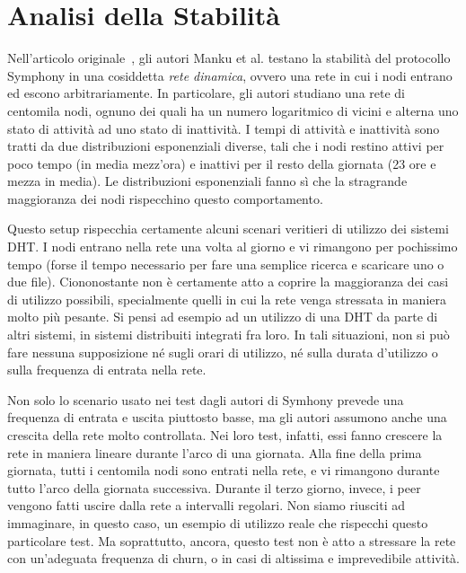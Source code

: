 \documentclass[prodmode,acmtap]{acmlarge}
\begin{document}
\section{Analisi della Stabilità} \label{stabilita}

Nell'articolo originale~\cite{symphony}, gli autori Manku et al. testano la stabilità del protocollo Symphony in una cosiddetta \emph{rete dinamica}, ovvero una rete in cui i nodi entrano ed escono arbitrariamente. In particolare, gli autori studiano una rete di centomila nodi, ognuno dei quali ha un numero logaritmico di vicini e alterna uno stato di attività ad uno stato di inattività. I tempi di attività e inattività sono tratti da due distribuzioni esponenziali diverse, tali che i nodi restino attivi per poco tempo (in media mezz'ora) e inattivi per il resto della giornata (23 ore e mezza in media). Le distribuzioni esponenziali fanno sì che la stragrande maggioranza dei nodi rispecchino questo comportamento.

Questo setup rispecchia certamente alcuni scenari veritieri di utilizzo dei sistemi DHT. I nodi entrano nella rete una volta al giorno e vi rimangono per pochissimo tempo (forse il tempo necessario per fare una semplice ricerca e scaricare uno o due file). Ciononostante non è certamente atto a coprire la maggioranza dei casi di utilizzo possibili, specialmente quelli in cui la rete venga stressata in maniera molto più pesante. Si pensi ad esempio ad un utilizzo di una DHT da parte di altri sistemi, in sistemi distribuiti integrati fra loro. In tali situazioni, non si può fare nessuna supposizione né sugli orari di utilizzo, né sulla durata d'utilizzo o sulla frequenza di entrata nella rete.

Non solo lo scenario usato nei test dagli autori di Symhony prevede una frequenza di entrata e uscita piuttosto basse, ma gli autori assumono anche una crescita della rete molto controllata. Nei loro test, infatti, essi fanno crescere la rete in maniera lineare durante l'arco di una giornata. Alla fine della prima giornata, tutti i centomila nodi sono entrati nella rete, e vi rimangono durante tutto l'arco della giornata successiva. Durante il terzo giorno, invece, i peer vengono fatti uscire dalla rete a intervalli regolari. Non siamo riusciti ad immaginare, in questo caso, un esempio di utilizzo reale che rispecchi questo particolare test. Ma soprattutto, ancora, questo test non è atto a stressare la rete con un'adeguata frequenza di churn, o in casi di altissima e imprevedibile attività.
\end{document}
